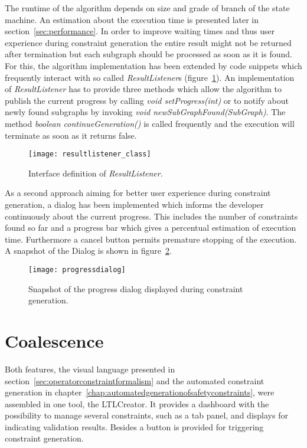The runtime of the algorithm depends on size and grade of branch of the state machine. An estimation about the execution time is presented later in section~\ref{sec:performance}. In order to improve waiting times and thus user experience during constraint generation the entire result might not be returned after termination but each subgraph should be processed as soon as it is found.
For this, the algorithm implementation has been extended by code snippets which frequently interact with so called \emph{ResultListener}s (figure~\ref{fig:resultlistener_class}).
An implementation of \emph{ResultListener} has to provide three methods which allow the algorithm to publish the current progress by calling \emph{void setProgress(int)} or to notify about newly found subgraphs by invoking \emph{void newSubGraphFound(SubGraph)}. The method \emph{boolean continueGeneration()} is called frequently and the execution will terminate as soon as it returns false.
\begin{figure}[htbp]
  \centering
  \texttt{[image: resultlistener\_class]} 
  \caption{Interface definition of \emph{ResultListener}.}
  \label{fig:resultlistener_class}
\end{figure}

As a second approach aiming for better user experience during constraint generation, a dialog has been implemented which informs the developer continuously about the current progress. This includes the number of constraints found so far and a progress bar which gives a percentual estimation of execution time. Furthermore a cancel button permits premature stopping of the execution. A snapshot of the Dialog is shown in figure~\ref{fig:progressdialog}.
\begin{figure}[htbp]
  \centering
  \texttt{[image: progressdialog]} 
  \caption{Snapshot of the progress dialog displayed during constraint generation.}
  \label{fig:progressdialog}
\end{figure}





\section{Coalescence}
\label{sec:coalescence}

Both features, the visual language presented in section~\ref{sec:operatorconstraintformalism} and the automated constraint generation in chapter~\ref{chap:automatedgenerationofsafetyconstraints}, were assembled in one tool, the LTLCreator. It provides a dashboard with the possibility to manage several constraints, such as a tab panel, and displays for indicating validation results. Besides a button is provided for triggering constraint generation.

